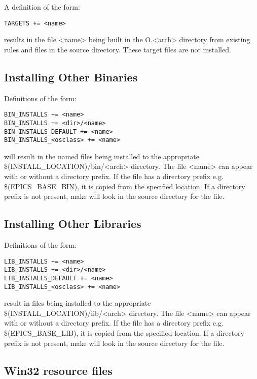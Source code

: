 A definition of the form:

\begin{verbatim}TARGETS += <name>
\end{verbatim}results in the file \textless{}name\textgreater{} being built in the O.\textless{}arch\textgreater{} directory from existing rules and files in the source directory. These 
target files are not installed.

\subsection{Installing Other Binaries}

Definitions of the form:

\begin{verbatim}BIN_INSTALLS += <name>
BIN_INSTALLS += <dir>/<name>
BIN_INSTALLS_DEFAULT += <name>
BIN_INSTALLS_<osclass> += <name>
\end{verbatim}will result in the named files being installed to the appropriate \$(INSTALL\_LOCATION)/bin/\textless{}arch\textgreater{} directory. The file 
\textless{}name\textgreater{} can appear with or without a directory prefix. If the file has a directory prefix e.g. \$(EPICS\_BASE\_BIN), it is 
copied from the specified location. If a directory prefix is not present, make will look in the source directory for the file.

\subsection{Installing Other Libraries}

Definitions of the form:

\begin{verbatim}LIB_INSTALLS += <name>
LIB_INSTALLS += <dir>/<name>
LIB_INSTALLS_DEFAULT += <name>
LIB_INSTALLS_<osclass> += <name>
\end{verbatim}result in files being installed to the appropriate \$(INSTALL\_LOCATION)/lib/\textless{}arch\textgreater{} directory. The file \textless{}name\textgreater{} can 
appear with or without a directory prefix. If the file has a directory prefix e.g. \$(EPICS\_BASE\_LIB), it is copied from the 
specified location. If a directory prefix is not present, make will look in the source directory for the file.

\subsection{Win32 resource files}

